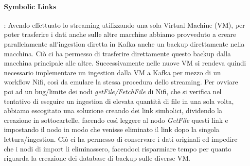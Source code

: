 \documentclass[fleqn,10pt]{SelfArx} %
\begin{document}
{{\paragraph{Symbolic Links}: Avendo effettuato lo streaming utilizzando una sola Virtual Machine (VM), per poter trasferire i dati anche sulle altre macchine abbiamo provveduto a creare parallelamente all'ingestion diretta in Kafka anche un backup direttamente nella macchina. Ciò ci ha permesso di trasferire direttamente questo backup dalla macchina principale alle altre. Successivamente nelle nuove VM si rendeva quindi necessario implementare un ingestion dalla VM a Kafka per mezzo di un workflow Nifi, così da emulare la stessa procedura dello streaming. Per ovviare poi ad un bug/limite dei nodi \textit{getFile/FetchFile} di Nifi, che si verifica nel tentativo di eseguire un ingestion di elevata quantità di file in una sola volta, abbiamo escogitato una soluzione creando dei link simbolici, dividendo la creazione in sottocartelle, facendo così leggere al nodo \textit{GetFile} questi link e impostando il nodo in modo che venisse eliminato il link dopo la singola lettura/ingestion. Ciò ci ha permesso di conservare i dati originali ed impedire che i nodi di import li eliminassero, facendoci risparmiare tempo per quanto riguarda la creazione dei database di backup sulle diverse VM.
}}
\end{document}
